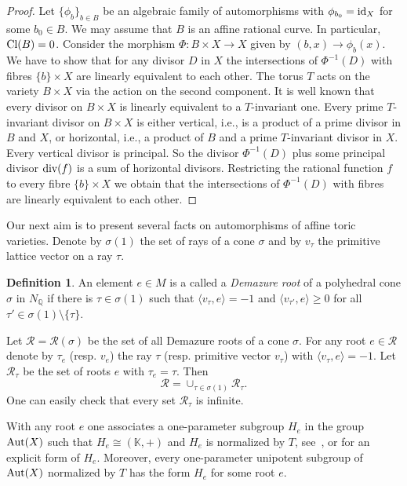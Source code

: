 \documentclass[12pt,a4paper]{amsart}
\theoremstyle{plain}
\theoremstyle{definition}
\newtheorem{definition}{Definition}
\begin{document}
\begin{proof}
Let $\{\phi_b\}_{b\in B}$ be an algebraic family of automorphisms with
$\phi_{b_0}={\mathop{\rm id}}_X$ for some $b_0\in B$. We may assume that $B$ is an affine
rational curve. In particular, ${\mathop{\rm Cl}}(B)=0$. Consider the morphism
$\Phi\colon B\times X \to X$ given by $(b,x)\to\phi_b(x)$.
We have to show that for any divisor $D$ in $X$ the intersections of $\Phi^{-1}(D)$
with fibres $\{b\}\times X$ are linearly equivalent to each other. The torus $T$ acts
on the variety $B\times X$ via the action on the second component. It is well known that
every divisor on $B\times X$ is linearly equivalent to a $T$-invariant one.
Every prime $T$-invariant divisor on $B\times X$ is either vertical, i.e., is a product
of a prime divisor in $B$ and $X$, or horizontal, i.e., a product of $B$ and a prime
$T$-invariant divisor in $X$. Every vertical divisor is principal. So the divisor
$\Phi^{-1}(D)$ plus some principal divisor ${\mathop{\rm div}}(f)$ is a sum of horizontal divisors.
Restricting the rational function $f$ to every fibre $\{b\}\times X$ we obtain that
the intersections of $\Phi^{-1}(D)$ with fibres are linearly equivalent to each other.
\end{proof}

Our next aim is to present several facts on automorphisms of affine toric varieties.
Denote by $\sigma(1)$ the set of rays of a cone $\sigma$ and by $v_\tau$ the primitive
lattice vector on a ray $\tau$.

\begin{definition}
An element $e\in M$ is a called a {\it Demazure root} of a polyhedral
cone $\sigma$ in $N_{{\mathbb Q}}$ if there is $\tau\in\sigma(1)$ such that
$\langle v_\tau, e\rangle =-1$ and $\langle v_{\tau'}, e\rangle \ge 0$
for all $\tau'\in\sigma(1)\setminus \{\tau\}$.
\end{definition}

Let $\mathcal{R}=\mathcal{R}(\sigma)$ be the set of all Demazure roots of a cone $\sigma$.
For any root $e\in\mathcal{R}$ denote by $\tau_e$ (resp. $v_e$)
the ray $\tau$ (resp. primitive vector $v_\tau$) with $\langle v_\tau, e\rangle =-1$.
Let $\mathcal{R}_\tau$ be the set of roots $e$ with $\tau_e=\tau$.
Then
$$
\mathcal{R} = \cup_{\tau\in\sigma(1)} \mathcal{R}_\tau.
$$
One can easily check that every set $\mathcal{R}_\tau$ is infinite.

With any root $e$ one associates a one-parameter subgroup $H_e$ in
the group ${\mathop{\rm Aut}}(X)$ such that $H_e \cong ({{\mathbb K}}, +)$ and $H_e$ is normalized
by $T$, see~\cite{De}, \cite{Oda} or \cite[Section~2]{AKZ} for an explicit
form of $H_e$. Moreover, every one-parameter unipotent subgroup of ${\mathop{\rm Aut}}(X)$
normalized by $T$ has the form $H_e$ for some root $e$.
\end{document}
